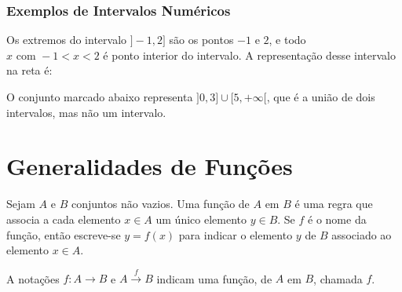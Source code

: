 \documentclass[12pt]{article}
\begin{document}
\subsubsection{Exemplos de Intervalos Numéricos}
Os extremos do intervalo $]-1, 2]$ são os pontos $-1\text{ e }2$, e todo $x\text{ com }-1 < x < 2$ é ponto interior do intervalo.
A representação desse intervalo na reta é: \\
\begin{center}
\end{center}

\noindent
O conjunto marcado abaixo representa $]0, 3] \cup  [5, +\infty[$, que é a união de dois intervalos, mas não um intervalo. \\
\begin{center}
\end{center}


\section{Generalidades de Funções}

Sejam $A \text{ e } B$ conjuntos não vazios. Uma função de $A$ em $B$ é uma regra que associa a cada elemento $x \in A$ um único elemento $y \in B$.
Se $f$ é o nome da função, então escreve-se $y = f (x)$ para indicar o elemento $y$ de $B$ associado ao elemento $x \in A$.

A notações $f:A \rightarrow B$ e $A \overset{f}{\rightarrow} B$ indicam uma função, de $A$ em $B$, chamada $f$.
\end{document}
